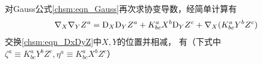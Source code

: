 对Gauss公式\eqref{chsm:eqn_Gauss}再次求协变导数，经简单计算有
\begin{equation}\label{chsm:eqn_DxDyZ}
    {\nabla}_{X} {\nabla}_{Y} Z^a = {\rm D}_{X} {\rm D}_{Y} Z^a
      + K^a_{bc} X^b {\rm D}_{Y} Z^c + {\nabla}_{X} ( K^a_{bc} Y^b Z^c )
\end{equation}
交换\eqref{chsm:eqn_DxDyZ}中$X,Y$的位置并相减，
有（下式中$\zeta^a\equiv K^{a}_{bc} Y^b Z^c, \eta^a\equiv K^{a}_{bc} X^b Z^c$）
\setlength{\mathindent}{0em}
